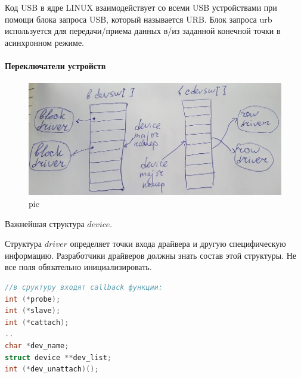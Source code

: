  

Код USB в ядре LINUX взаимодействует со всеми USB устройствами при помощи блока запроса USB, который называется URB. Блок запроса urb используется для передачи/приема данных в/из заданной конечной точки в асинхронном режиме.

\paragraph{Переключатели устройств}

\begin{figure}[H]
  \centering
  \includegraphics[width=\textwidth]{pic/1.png}
  \caption{pic}
\end{figure}

Важнейшая структура $device$. 

Структура $driver$ определяет точки входа драйвера и другую специфическую информацию. Разработчики драйверов должны знать состав этой структуры. Не все поля обязательно инициализировать.

\begin{lstlisting}[language=c]
//в сруктуру входят callback функции:
int (*probe);
int (*slave);
int (*cattach);
..
char *dev_name;
struct device **dev_list;
int (*dev_unattach)();
\end{lstlisting}


